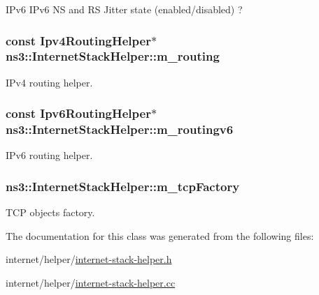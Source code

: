 I\+Pv6 I\+Pv6 NS and RS Jitter state (enabled/disabled) ? 

\subsubsection[{\texorpdfstring{m\+\_\+routing}{m_routing}}]{\setlength{\rightskip}{0pt plus 5cm}const {\bf Ipv4\+Routing\+Helper}$\ast$ ns3\+::\+Internet\+Stack\+Helper\+::m\+\_\+routing\hspace{0.3cm}{\ttfamily [private]}}\hypertarget{classns3_1_1InternetStackHelper_a575127688a08b5a2f3f8e07839ea9807}{}\label{classns3_1_1InternetStackHelper_a575127688a08b5a2f3f8e07839ea9807}


I\+Pv4 routing helper. 

\subsubsection[{\texorpdfstring{m\+\_\+routingv6}{m_routingv6}}]{\setlength{\rightskip}{0pt plus 5cm}const {\bf Ipv6\+Routing\+Helper}$\ast$ ns3\+::\+Internet\+Stack\+Helper\+::m\+\_\+routingv6\hspace{0.3cm}{\ttfamily [private]}}\hypertarget{classns3_1_1InternetStackHelper_ab00253ad66b420c44ab0226d333c51dd}{}\label{classns3_1_1InternetStackHelper_ab00253ad66b420c44ab0226d333c51dd}


I\+Pv6 routing helper. 

\subsubsection[{\texorpdfstring{m\+\_\+tcp\+Factory}{m_tcpFactory}}]{ ns3\+::\+Internet\+Stack\+Helper\+::m\+\_\+tcp\+Factory\hspace{0.3cm}{\ttfamily [private]}}\hypertarget{classns3_1_1InternetStackHelper_a70733544910e58abfe1b238263ea5a68}{}\label{classns3_1_1InternetStackHelper_a70733544910e58abfe1b238263ea5a68}


T\+CP objects factory. 



The documentation for this class was generated from the following files\+:\begin{DoxyCompactItemize}
\item 
internet/helper/\hyperlink{internet-stack-helper_8h}{internet-\/stack-\/helper.\+h}\item 
internet/helper/\hyperlink{internet-stack-helper_8cc}{internet-\/stack-\/helper.\+cc}\end{DoxyCompactItemize}
